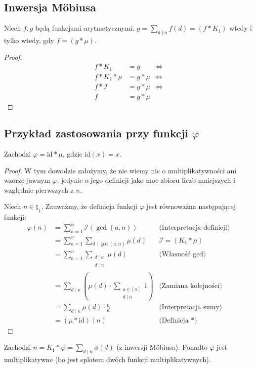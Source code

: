 \subsection{Inwersja Möbiusa}
\begin{theorem}
	Niech \(f, g\) będą funkcjami arytmetycznymi.
	\(g = \sum_{d \mid n} f(d) = (f * K_1)\) wtedy i tylko wtedy,
	gdy \(f = (g * \mu)\).
\end{theorem}
\begin{proof}
	\begin{align*}
		f * K_1        & = g       & \iff \\
		f * K_1 * \mu  & = g * \mu & \iff \\
		f * \mathcal I & = g * \mu & \iff \\
		f              & = g * \mu
	\end{align*}
\end{proof}

\subsection{Przykład zastosowania przy funkcji \texorpdfstring{\(\varphi\)}{phi}}
\begin{theorem}
	Zachodzi \(\varphi = \text{id} * \mu\), gdzie \(\text{id}(x) = x\).
\end{theorem}
\begin{proof}
	W tym dowodzie założymy, że nie wiemy nic o multiplikatywności ani
	wzorze jawnym \(\varphi\), jedynie o jego definicji jako moc zbioru liczb
	mniejszych i względnie pierwszych z \(n\).

	Niech \(n \in \natural_1\).
	Zauważmy, że definicja funkcji \(\varphi\) jest równoważna następującej funkcji:
	\begin{align*}
		\varphi(n) & = \sum_{a=1}^{n} \mathcal I(\gcd(a, n))                        & \text{(Interpretacja definicji)}  \\
		           & = \sum_{a=1}^{n} \sum_{d \mid \gcd(a, n)} \mu(d)               & \text{$\mathcal I = (K_1 * \mu)$} \\
		           & = \sum_{a=1}^{n} \sum_{\substack{d \mid a                                                          \\ d \mid n}} \mu(d) & \text{(Własność \(\gcd\))} \\
		           & = \sum_{d \mid n} \left(\mu(d) \cdot \sum_{\substack{a \in [n]                                     \\ d \mid a}} 1 \right) & \text{(Zamiana kolejności)} \\
		           & = \sum_{d \mid n} \mu(d) \cdot \frac{n}{d}                     & \text{(Interpretacja sumy)}       \\
		           & = (\mu * \text{id})(n)                                         & \text{(Definicja $*$)}
	\end{align*}
\end{proof}

\begin{corollary}
	Zachodzi \(n = K_1 * \varphi = \sum_{d \mid n} \phi(d)\) (z inwersji Möbiusa).
	Ponadto \(\varphi\) jest multiplikatywne (bo jest splotem dwóch funkcji multiplikatywnych).
\end{corollary}

